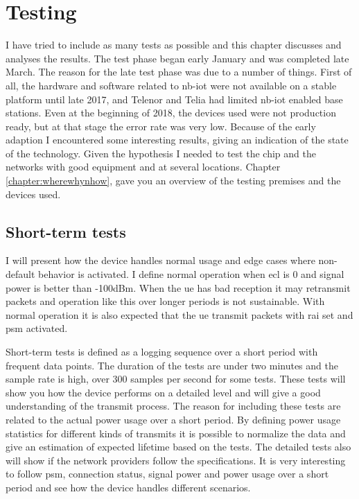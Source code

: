 \documentclass[USenglish]{ifimaster}  %
\begin{document}
\chapter{Testing} \label{section:testing}
I have tried to include as many tests as possible and this chapter discusses and analyses the results. The test phase began early January and was completed late March. The reason for the late test phase was due to a number of things. First of all, the hardware and software related to \acrshort{nb-iot} were not available on a stable platform until late 2017, and Telenor and Telia had limited \acrshort{nb-iot} enabled base stations. Even at the beginning of 2018, the devices used were not production ready, but at that stage the error rate was very low. Because of the early adaption I encountered some interesting results, giving an indication of the state of the technology. Given the hypothesis I needed to test the chip and the networks with good equipment and at several locations. Chapter \vref{chapter:wherewhynhow}, gave you an overview of the testing premises and the devices used.

\section{Short-term tests} \label{section:detailedtest}
I will present how the device handles normal usage and edge cases where non-default behavior is activated. I define normal operation when \acrshort{ecl} is 0 and signal power is better than -100dBm. When the \acrshort{ue} has bad reception it may retransmit packets and operation like this over longer periods is not sustainable. With normal operation it is also expected that the \acrshort{ue} transmit packets with \acrshort{rai} set and \acrshort{psm} activated.

Short-term tests is defined as a logging sequence over a short period with frequent data points. The duration of the tests are under two minutes and the sample rate is high, over 300 samples per second for some tests. These tests will show you how the device performs on a detailed level and will give a good understanding of the transmit process. The reason for including these tests are related to the actual power usage over a short period. By defining power usage statistics for different kinds of transmits it is possible to normalize the data and give an estimation of expected lifetime based on the tests. The detailed tests also will show if the network providers follow the specifications. It is very interesting to follow \acrshort{psm}, connection status, signal power and power usage over a short period and see how the device handles different scenarios.
\end{document}
